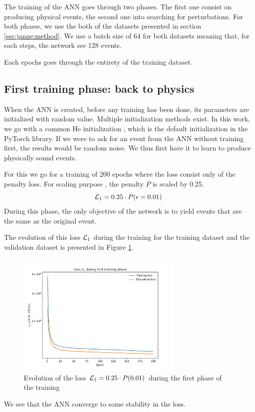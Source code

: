 \documentclass[../main.tex]{subfiles}
\begin{document}
The training of the ANN goes through two phases. The first one consist on producing physical events, the second one into searching for perturbations. For both phases, we use the both of the datasets presented in section \ref{sec:janne:method}. We use a batch size of 64 for both datasets meaning that, for each steps, the network see 128 events.

Each epochs goes through the entirety of the training dataset.

\subsection{First training phase: back to physics}
\label{sec:janne:results:identity}

When the ANN is created, before any training has been done, its parameters are initialized with random value. Multiple initialization methods exist. In this work, we go with a common He initialization \cite{he_delving_2015}, which is the default initialization in the PyTorch \cite{ansel_pytorch_2024} library. If we were to ask for an event from the ANN without training first, the results would be random noise. We thus first have it to learn to produce physically sound events.

For this we go for a training of 200 epochs where the loss consist only of the penalty loss. For scaling purpose , the penalty $P$ is scaled by 0.25.
\begin{equation}
  {\cal L}_1 = 0.25 \cdot P(\epsilon = 0.01)
\end{equation}
During this phase, the only objective of the network is to yield events that are the same as the original event.

The evolution of this loss ${\cal L}_1$ during the training for the training dataset and the validation dataset is presented in Figure \ref{fig:jann:train:phase_1}.
\begin{figure}[ht]
  \centering
  \includegraphics[height=6cm]{images/janne/training/phase_1_penal.png}
  \caption{Evolution of the loss ${\cal L}_1 = 0.25 \cdot P(0.01)$ during the first phase of the training}
  \label{fig:jann:train:phase_1}
\end{figure}
We see that the ANN converge to some stability in the loss.
\end{document}
